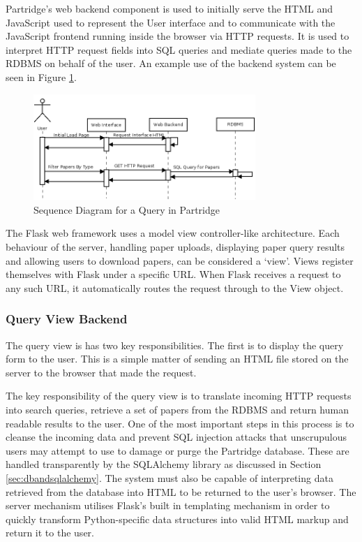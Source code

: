 Partridge's web backend component is used to initially serve the HTML and
JavaScript used to represent the User interface and to communicate with the
JavaScript frontend running inside the browser via HTTP requests. It is used to
interpret HTTP request fields into SQL queries and mediate queries made to the
RDBMS on behalf of the user. An example use of the backend system can be seen
in Figure \ref{fig:backend_sequence}.

\begin{figure}[!ht]
\centering
\includegraphics[width=0.75\textwidth]{images/design/backend_sequence.png}
\caption{Sequence Diagram for a Query in Partridge}
\label{fig:backend_sequence}
\end{figure}

The Flask web framework uses a model view controller-like architecture. Each
behaviour of the server, handling paper uploads, displaying paper query
results and allowing users to download papers, can be considered a `view'. Views
register themselves with Flask under a specific URL. When Flask receives a
request to any such URL, it automatically routes the request through to the
View object\cite{flask2012}.

\subsubsection{Query View Backend}
The query view is has two key responsibilities. The first is to display the
query form to the user. This is a simple matter of sending an HTML file stored
on the server to the browser that made the request. 

The key responsibility of the query view is to translate incoming HTTP requests
into search queries, retrieve a set of papers from the RDBMS  and return human
readable results to the user. One of the most important steps in this process
is to cleanse the incoming data and prevent SQL injection attacks that
unscrupulous users may attempt to use to damage or purge the Partridge
database. These are handled transparently by the SQLAlchemy library as
discussed in Section \ref{sec:dbandsqlalchemy}. The system must also be capable
of interpreting data retrieved from the database into HTML to be returned to
the user's browser. The server mechanism utilises Flask's built in templating
mechanism in order to quickly transform Python-specific data structures into
valid HTML markup and return it to the user\cite{flask2012}.

